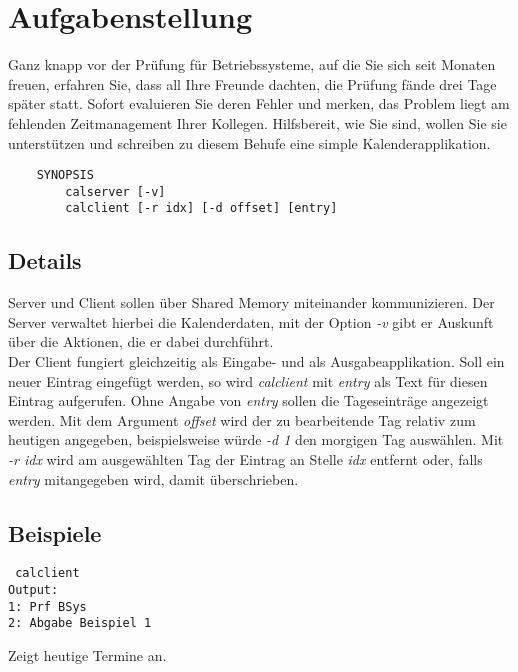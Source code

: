




\section*{Aufgabenstellung}

Ganz knapp vor der Prüfung für Betriebssysteme, auf die Sie sich seit 
Monaten freuen, erfahren Sie, dass all Ihre Freunde dachten, die Prüfung fände 
drei Tage später statt. Sofort evaluieren Sie deren Fehler und merken, das Problem
liegt am fehlenden Zeitmanagement Ihrer Kollegen. Hilfsbereit, wie Sie sind, wollen 
Sie sie unterstützen und schreiben zu diesem Behufe eine simple Kalenderapplikation.

\begin{verbatim}
    SYNOPSIS
        calserver [-v]
        calclient [-r idx] [-d offset] [entry]
\end{verbatim}

\subsection*{Details}

Server und Client sollen über Shared Memory miteinander 
kommunizieren. Der Server verwaltet hierbei die Kalenderdaten, 
mit der Option \emph{-v} gibt er Auskunft über die Aktionen, 
die er dabei durchführt.\\
Der Client fungiert gleichzeitig als Eingabe- und als Ausgabeapplikation. 
Soll ein neuer Eintrag eingefügt werden, so wird \emph{calclient} mit 
\emph{entry} als Text für diesen Eintrag aufgerufen. Ohne Angabe von \emph{entry} 
sollen die Tageseinträge angezeigt werden.
Mit dem Argument \emph{offset} wird der zu bearbeitende Tag relativ zum heutigen
angegeben, beispielsweise würde \emph{-d 1} den morgigen Tag auswählen. Mit 
\emph{-r idx} wird am ausgewählten Tag der Eintrag an Stelle \emph{idx} entfernt 
oder, falls \emph{entry} mitangegeben wird, damit überschrieben.

\subsection*{Beispiele}

\begin{verbatim} calclient 
Output: 
1: Prf BSys
2: Abgabe Beispiel 1
\end{verbatim}
Zeigt heutige Termine an.

